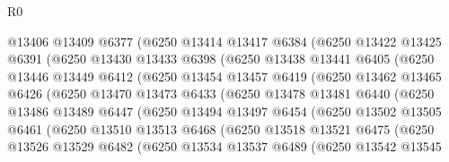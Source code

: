 \begin{lexlean}{R0}
\begin{coremodule}
              @13406
              @13409
              @6377
              (@6250
                @13414
                @13417
                @6384
                (@6250
                  @13422
                  @13425
                  @6391
                  (@6250
                    @13430
                    @13433
                    @6398
                    (@6250
                      @13438
                      @13441
                      @6405
                      (@6250
                        @13446
                        @13449
                        @6412
                        (@6250
                          @13454
                          @13457
                          @6419
                          (@6250
                            @13462
                            @13465
                            @6426
                            (@6250
                              @13470
                              @13473
                              @6433
                              (@6250
                                @13478
                                @13481
                                @6440
                                (@6250
                                  @13486
                                  @13489
                                  @6447
                                  (@6250
                                    @13494
                                    @13497
                                    @6454
                                    (@6250
                                      @13502
                                      @13505
                                      @6461
                                      (@6250
                                        @13510
                                        @13513
                                        @6468
                                        (@6250
                                          @13518
                                          @13521
                                          @6475
                                          (@6250
                                            @13526
                                            @13529
                                            @6482
                                            (@6250
                                              @13534
                                              @13537
                                              @6489
                                              (@6250
                                                @13542
                                                @13545

\end{coremodule}
\end{lexlean}
